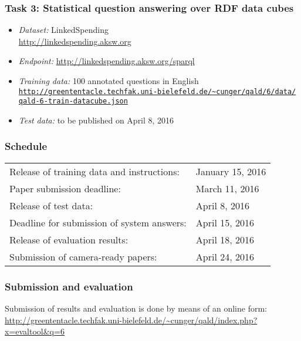 \documentclass[a4paper]{article}
\begin{document}
{\subsubsection*{Task 3: Statistical question answering over RDF data cubes}
\begin{itemize}
\item \emph{Dataset:} LinkedSpending\\ \url{http://linkedspending.aksw.org}
\item \emph{Endpoint:} \url{http://linkedspending.aksw.org/sparql}
\item \emph{Training data:} 100 annotated questions in English \\
\href{http://greententacle.techfak.uni-bielefeld.de/~cunger/qald/6/data/qald-6-train-datacube.json}{\texttt{http://greententacle.techfak.uni-bielefeld.de/\textasciitilde cunger/qald/6/data/\\qald-6-train-datacube.json}}
\item \emph{Test data:} to be published on April 8, 2016
\end{itemize}

\subsubsection*{Schedule}

\begin{tabular}{ll}
Release of training data and instructions: & January 15, 2016\\
Paper submission deadline: & March 11, 2016\\
Release of test data: & April 8, 2016\\
Deadline for submission of system answers: & April 15, 2016 \\
Release of evaluation results: & April 18, 2016 \\
Submission of camera-ready papers: & April 24, 2016 \\
\end{tabular}

\subsubsection*{Submission and evaluation}

Submission of results and evaluation is done by means of an online form:\\
\url{http://greententacle.techfak.uni-bielefeld.de/~cunger/qald/index.php?x=evaltool&q=6}

}
\end{document}
